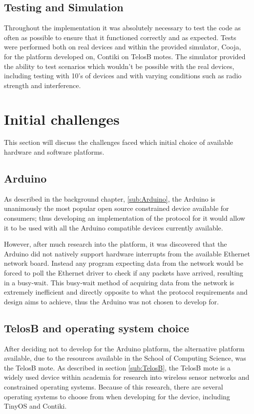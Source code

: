 \subsection{Testing and Simulation} %
\label{sub:testing_and_simulation}
Throughout the implementation it was absolutely necessary to test the code as often as possible to ensure that it functioned correctly and as expected. Tests were performed both on real devices and within the provided simulator, Cooja, for the platform developed on, Contiki on TelosB motes. The simulator provided the ability to test scenarios which wouldn't be possible with the real devices, including testing with 10's of devices and with varying conditions such as radio strength and interference.





\section{Initial challenges} %
\label{sec:initial_challenges}
This section will discuss the challenges faced which initial choice of available hardware and software platforms.
\subsection{Arduino} %
\label{sec:arduino}
As described in the background chapter, \ref{sub:Arduino}, the Arduino is unanimously the most popular open source constrained device available for consumers; thus developing an implementation of the protocol for it would allow it to be used with all the Arduino compatible devices currently available.

However, after much research into the platform, it was discovered that the Arduino did not natively support hardware interrupts from the available Ethernet network board.\cite{ArduinoEthernet} Instead any program expecting data from the network would be forced to poll the Ethernet driver to check if any packets have arrived, resulting in a busy-wait. This busy-wait method of acquiring data from the network is extremely inefficient and directly opposite to what the protocol requirements and design aims to achieve, thus the Arduino was not chosen to develop for.

\subsection{TelosB and operating system choice}
After deciding not to develop for the Arduino platform, the alternative platform available, due to the resources available in the School of Computing Science, was the TelosB mote. As described in section \ref{sub:TelosB}, the TelosB mote is a widely used device within academia for research into wireless sensor networks and constrained operating systems. Because of this research, there are several operating systems to choose from when developing for the device, including TinyOS and Contiki.

